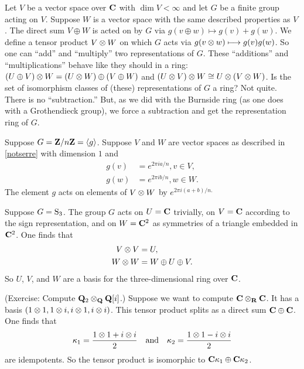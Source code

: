 \documentclass[11pt, oneside,margin=1in]{article}
\begin{document}
\begin{example}\label{notserre}
Let $V$ be a vector space over $\mathbf C$ with $\dim V < \infty$ and let $G$ be a finite group acting on $V$. Suppose $W$ is a vector space with the same described properties as $V$. The direct sum $V\oplus W$ is acted on by $G$ via $g(v\oplus w) \longmapsto g(v) +g(w)$. We define a tensor product $V\otimes W$ on which $G$ acts via $g(v\otimes w) \longmapsto g(v) g(w)$. So one can ``add'' and ``multiply'' two representations of $G$. These ``additions'' and ``multiplications'' behave like they should in a ring: $(U\oplus V) \otimes W = (U\otimes W) \oplus (V\oplus W)$ and $(U\otimes V) \otimes W \cong U\otimes (V\otimes W)$. Is the set of isomorphism classes of (these) representations of $G$ a ring? Not quite. There is no ``subtraction.'' But, as we did with the Burnside ring (as one does with a Grothendieck group), we force a subtraction and get the representation ring of $G$.  
\end{example}

\begin{example}\label{}
Suppose $G=\mathbf Z / n\mathbf Z = \langle g \rangle$. Suppose $V$ and $W$ are vector spaces as described in \cref{notserre} with dimension $1$ and 
\begin{align*}
	g(v)& = e^{2\pi ia/n}, v\in V,\\
	g(w) &= e^{2\pi i b/n}, w\in W.
\end{align*}
The element $g$ acts on elements of $V\otimes W$ by $e^{2\pi i (a+b)/n.}$ 

Suppose $G=\operatorname{S}_{3}$. The group $G$ acts on $U=\mathbf C$ trivially, on $V=\mathbf C$ according to the sign representation, and on $W = \mathbf C^2$ as symmetries of a triangle embedded in $\mathbf C^2$. One finds that
\begin{align*}
	V\otimes V &= U,\\
	W\otimes W &= W \oplus U \oplus V.
\end{align*}
So $U$, $V$, and $W$ are a basis for the three-dimensional ring over $\mathbf C$.
\end{example}

\begin{example}\label{}
	(Exercise: Compute $\mathbf Q_2 \otimes_\mathbf Q \mathbf Q[i]$.) Suppose we want to compute $\mathbf C \otimes_\mathbf R \mathbf C$. It has a basis $(1\otimes 1, 1\otimes i, i\otimes 1, i\otimes i)$. This tensor product splits as a direct sum $\mathbf C\oplus \mathbf C$. One finds that 
	\begin{align*}
		\kappa_1 = \frac{1\otimes 1 + i\otimes i}{2} \quad \textrm{and} \quad \kappa_2 = \frac{1\otimes 1 - i\otimes i}{2}
	\end{align*}
are idempotents. So the tensor product is isomorphic to $\mathbf C\kappa_1 \oplus \mathbf C\kappa_2$.
\end{example}
\end{document}
